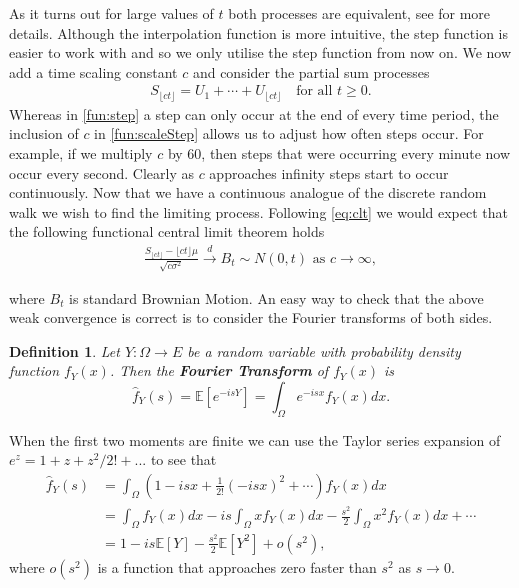 \documentclass[honours,12pt]{unswthesis}
\newcommand{\E}{\mathbb{E}}
\newcommand{\1}{\mathbf 1}
\newtheorem{definition}[equation]{Definition}
\numberwithin{equation}{section}
\theoremstyle{definition}
\theoremstyle{remark}
\begin{document}
\noindent As it turns out for large values of $t$ both processes are equivalent, see \cite{Whitt2010} for more details. Although the interpolation function is more intuitive, the step function is easier to work with and so we only utilise the step function from now on. We now add a time scaling constant $c$ and consider the partial sum processes
\begin{align}\label{fun:scaleStep}
	S_{\lfloor ct \rfloor}=U_1+\cdots+U_{\lfloor ct \rfloor}  \quad\textrm{for all } t\geq0.
\end{align}
Whereas in \ref{fun:step} a step can only occur at the end of every time period, the inclusion of $c$ in \ref{fun:scaleStep} allows us to adjust how often steps occur. For example, if we multiply $c$ by 60, then steps that were occurring every minute now occur every second. Clearly as $c$ approaches infinity steps start to occur continuously. Now that we have a continuous analogue of the discrete random walk we wish to find the limiting process. Following \ref{eq:clt} we would expect that the following functional central limit theorem holds
\begin{align}\label{eq:BMconv}
	\frac{S_{\lfloor ct\rfloor}-\lfloor ct \rfloor \mu}{\sqrt{c\sigma^2}}\overset{d}{\longrightarrow}B_t\sim N(0,t)\textrm{ as $c\to\infty$},
\end{align}

\noindent where $B_t$ is standard Brownian Motion. An easy way to check that the above weak convergence is correct is to consider the Fourier transforms of both sides.\\
\begin{definition}
	Let $Y:\Omega\to E$ be a random variable with probability density function $f_Y(x)$. Then the \textbf{Fourier Transform}  of $f_Y(x)$ is
	\[
		\hat{f}_Y(s)=\E[e^{-isY}]=\int_\Omega e^{-isx} f_Y(x)dx.
	\]
\end{definition}

\noindent When the first two moments are finite we can use the Taylor series expansion of $e^z=1+z+z^2/2!+...$ to see that
\begin{align}
	\hat{f}_Y(s)&=\int_\Omega\left(1-isx+\frac{1}{2!}(-isx)^2+\cdots \right)f_Y(x)dx\\
	&=\int_\Omega f_Y(x)dx - is \int_\Omega x f_Y(x)dx - \frac{s^2}{2}\int_\Omega x^2 f_Y(x)dx +\cdots\\
	&=1-is\E[Y]-\frac{s^2}{2}\E[Y^2] +o(s^2),
\end{align}
\noindent where $o(s^2)$ is a function that approaches zero faster than $s^2$ as $s\to0.$ 
\end{document}
